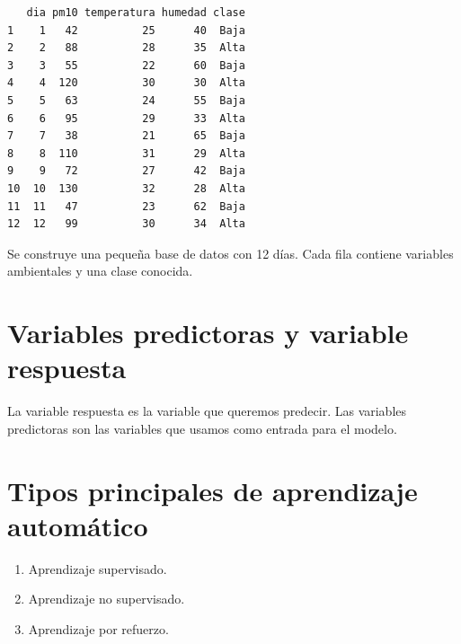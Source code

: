 \documentclass[
  spanish,
  11pt,
  letterpaper,
]{book}
\providecommand{\tightlist}{%
  \setlength{\itemsep}{0pt}\setlength{\parskip}{0pt}}
\begin{document}
\begin{verbatim}
   dia pm10 temperatura humedad clase
1    1   42          25      40  Baja
2    2   88          28      35  Alta
3    3   55          22      60  Baja
4    4  120          30      30  Alta
5    5   63          24      55  Baja
6    6   95          29      33  Alta
7    7   38          21      65  Baja
8    8  110          31      29  Alta
9    9   72          27      42  Baja
10  10  130          32      28  Alta
11  11   47          23      62  Baja
12  12   99          30      34  Alta
\end{verbatim}

\begin{tcolorbox}[enhanced jigsaw, arc=.35mm, bottomrule=.15mm, bottomtitle=1mm, breakable, colback=white, colbacktitle=quarto-callout-note-color!10!white, colframe=quarto-callout-note-color-frame, coltitle=black, left=2mm, leftrule=.75mm, opacityback=0, opacitybacktitle=0.6, rightrule=.15mm, title=\textcolor{quarto-callout-note-color}{\faInfo}\hspace{0.5em}{Explicación del código}, titlerule=0mm, toprule=.15mm, toptitle=1mm]

Se construye una pequeña base de datos con 12 días. Cada fila contiene
variables ambientales y una clase conocida.

\end{tcolorbox}

\section{Variables predictoras y variable
respuesta}\label{variables-predictoras-y-variable-respuesta}

La variable respuesta es la variable que queremos predecir. Las
variables predictoras son las variables que usamos como entrada para el
modelo.

\section{Tipos principales de aprendizaje
automático}\label{tipos-principales-de-aprendizaje-automuxe1tico}

\begin{enumerate}
\def\labelenumi{\arabic{enumi}.}
\tightlist
\item
  Aprendizaje supervisado.
\item
  Aprendizaje no supervisado.
\item
  Aprendizaje por refuerzo.
\end{enumerate}
\end{document}
